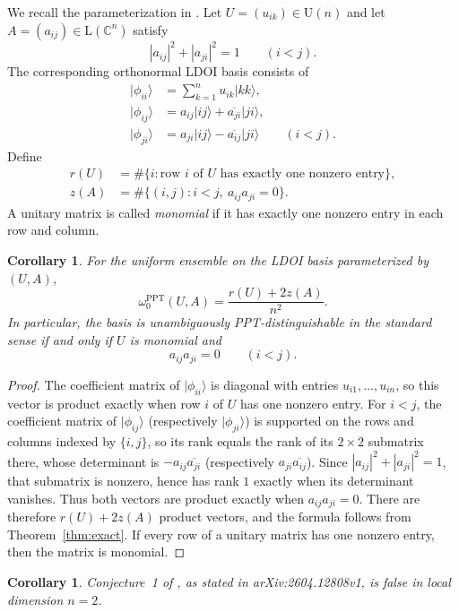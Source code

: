 \documentclass[11pt]{amsart}
\newtheorem{corollary}[theorem]{Corollary}
\theoremstyle{remark}
\newcommand{\C}{\mathbb{C}}
\newcommand{\ket}[1]{\lvert #1\rangle}
\begin{document}
We recall the parameterization in \cite[Definition~6]{JohnstonRusso}. Let
$U=(u_{ik})\in\mathrm U(n)$ and let $A=(a_{ij})\in\mathrm L(\C^n)$ satisfy
\[
  |a_{ij}|^2+|a_{ji}|^2=1
  \qquad(i<j).
\]
The corresponding orthonormal LDOI basis consists of
\begin{align*}
  \ket{\phi_{ii}}
    &=\sum_{k=1}^{n}u_{ik}\ket{kk},\\
  \ket{\phi_{ij}}
    &=a_{ij}\ket{ij}+\overline{a_{ji}}\ket{ji},\\
  \ket{\phi_{ji}}
    &=a_{ji}\ket{ij}-\overline{a_{ij}}\ket{ji}
    \qquad(i<j).
\end{align*}
Define
\begin{align*}
  r(U)
    &=\#\{i:\text{row }i\text{ of }U\text{ has exactly one nonzero entry}\},\\
  z(A)
    &=\#\{(i,j):i<j,\ a_{ij}a_{ji}=0\}.
\end{align*}
A unitary matrix is called \emph{monomial} if it has exactly one nonzero entry
in each row and column.

\begin{corollary}\label{cor:ldoi}
For the uniform ensemble on the LDOI basis parameterized by $(U,A)$,
\[
  \omega^{\mathrm{PPT}}_0(U,A)
  =\frac{r(U)+2z(A)}{n^2}.
\]
In particular, the basis is unambiguously PPT-distinguishable in the standard
sense if and only if $U$ is monomial and
\[
  a_{ij}a_{ji}=0
  \qquad(i<j).
\]
\end{corollary}

\begin{proof}
The coefficient matrix of $\ket{\phi_{ii}}$ is diagonal with entries
$u_{i1},\ldots,u_{in}$, so this vector is product exactly when row $i$ of $U$
has one nonzero entry. For $i<j$, the coefficient matrix of $\ket{\phi_{ij}}$
(respectively $\ket{\phi_{ji}}$) is supported on the rows and columns indexed by
$\{i,j\}$, so its rank equals the rank of its $2\times2$ submatrix there, whose
determinant is $-a_{ij}\overline{a_{ji}}$ (respectively
$a_{ji}\overline{a_{ij}}$). Since $|a_{ij}|^2+|a_{ji}|^2=1$, that submatrix is
nonzero, hence has rank $1$ exactly when its determinant vanishes. Thus both
vectors are product exactly when $a_{ij}a_{ji}=0$. There are therefore
$r(U)+2z(A)$ product vectors, and the formula follows from
Theorem~\ref{thm:exact}. If every row of a unitary matrix has one nonzero entry,
then the matrix is monomial.
\end{proof}

\begin{corollary}\label{cor:bell}
Conjecture~1 of \cite{JohnstonRusso}, as stated in
arXiv:2604.12808v1, is false in local dimension $n=2$.
\end{corollary}
\end{document}
